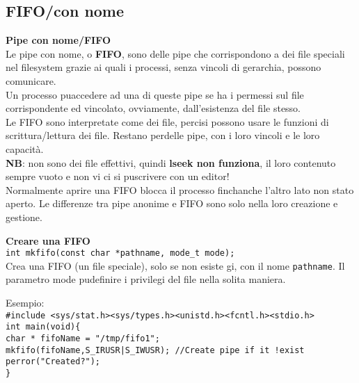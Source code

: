 \begin{flushleft}
  \subsection{FIFO/con nome}
  \textbf{Pipe con nome/FIFO}\\
  Le pipe con nome, o \textbf{FIFO}, sono delle pipe che corrispondono a dei file speciali nel 
  filesystem grazie ai quali i processi, senza vincoli di gerarchia, possono comunicare. \\
  Un processo pu\aco accedere ad una di queste pipe se ha i permessi sul file 
  corrispondente ed \ace vincolato, ovviamente, dall'esistenza del file stesso.\\
  Le FIFO sono interpretate come dei file, perci\aco si possono usare le funzioni di 
  scrittura/lettura dei file. Restano per\aco delle pipe, con i loro 
  vincoli e le loro capacità. \\ 
  \textbf{NB}: non sono dei file effettivi, quindi \textbf{lseek non funziona}, il 
  loro contenuto \ace sempre vuoto e non vi ci si pu\aco scrivere con un editor!\\
  Normalmente aprire una FIFO blocca il processo finch\ace anche l'altro lato non \ace stato
  aperto. Le differenze tra pipe anonime e FIFO sono solo nella loro creazione e gestione. 
  \begin{flushleft}
    \textbf{Creare una FIFO}\\
    \texttt{int mkfifo(const char *pathname, mode\_t mode);}\\
    Crea una FIFO (un file speciale), solo se non esiste gi\aca, con il nome \texttt{pathname}. Il 
    parametro mode pu\aco definire i privilegi del file nella solita maniera. 
    \begin{flushleft}
      Esempio: \\
      \texttt{\#include <sys/stat.h><sys/types.h><unistd.h><fcntl.h><stdio.h>\\
              int main(void)\{\\
              \halftab char * fifoName = "/tmp/fifo1";\\
              \halftab mkfifo(fifoName,S\_IRUSR|S\_IWUSR); //Create pipe if it !exist\\
              \halftab perror("Created?");\\
              \}}
    \end{flushleft}
  \end{flushleft}
  \begin{flushleft}

\end{flushleft}
\end{flushleft}
